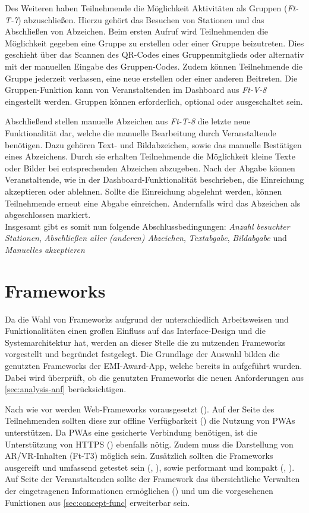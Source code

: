 Des Weiteren haben Teilnehmende die Möglichkeit Aktivitäten als Gruppen
(\textit{Ft-T-7}) abzuschließen. Hierzu gehört das Besuchen von Stationen und
das Abschließen von Abzeichen. Beim ersten Aufruf wird Teilnehmenden die
Möglichkeit gegeben eine Gruppe zu erstellen oder einer Gruppe beizutreten. Dies
geschieht über das Scannen des QR-Codes eines Gruppenmitglieds oder alternativ
mit der manuellen Eingabe des Gruppen-Codes. Zudem können Teilnehmende die
Gruppe jederzeit verlassen, eine neue erstellen oder einer anderen Beitreten.
Die Gruppen-Funktion kann von Veranstaltenden im Dashboard aus \textit{Ft-V-8}
eingestellt werden. Gruppen können erforderlich, optional oder ausgeschaltet
sein.

Abschließend stellen manuelle Abzeichen aus \textit{Ft-T-8} die letzte neue
Funktionalität dar, welche die manuelle Bearbeitung durch Veranstaltende
benötigen. Dazu gehören Text- und Bildabzeichen, sowie das manuelle Bestätigen
eines Abzeichens. Durch sie erhalten Teilnehmende die Möglichkeit kleine Texte
oder Bilder bei entsprechenden Abzeichen abzugeben. Nach der Abgabe können
Veranstaltende, wie in der Dashboard-Funktionalität beschrieben, die Einreichung
akzeptieren oder ablehnen. Sollte die Einreichung abgelehnt werden, können
Teilnehmende erneut eine Abgabe einreichen. Andernfalls wird das Abzeichen als
abgeschlossen markiert. \\
Insgesamt gibt es somit nun folgende Abschlussbedingungen: \textit{Anzahl
    besuchter Stationen}, \textit{Abschließen aller (anderen) Abzeichen},
\textit{Textabgabe}, \textit{Bildabgabe} und \textit{Manuelles akzeptieren}

\section{Frameworks} \label{sec:frameworks}

Da die Wahl von Frameworks aufgrund der unterschiedlich Arbeitsweisen und
Funktionalitäten einen großen Einfluss auf das Interface-Design und die
Systemarchitektur hat, werden an dieser Stelle die zu nutzenden Frameworks
vorgestellt und begründet festgelegt. Die Grundlage der Auswahl bilden die
genutzten Frameworks der EMI-Award-App, welche bereits in
 aufgeführt wurden. Dabei wird überprüft, ob die
genutzten Frameworks die neuen Anforderungen aus \autoref{sec:analysis-anf}
berücksichtigen.

Nach wie vor werden Web-Frameworks vorausgesetzt (). Auf der Seite
des Teilnehmenden sollten diese zur offline Verfügbarkeit () die
Nutzung von \acp{PWA} unterstützen. Da \acp{PWA} eine gesicherte Verbindung
benötigen, ist die Unterstützung von HTTPS () ebenfalls nötig. Zudem
muss die Darstellung von \ac{AR}/\ac{VR}-Inhalten (Ft-T3) möglich sein. Zusätzlich sollten
die Frameworks ausgereift und umfassend getestet sein (,
), sowie performant und kompakt (, ). Auf
Seite der Veranstaltenden sollte der Framework das übersichtliche Verwalten der
eingetragenen Informationen ermöglichen () und um die vorgesehenen
Funktionen aus \autoref{sec:concept-func} erweiterbar sein.

